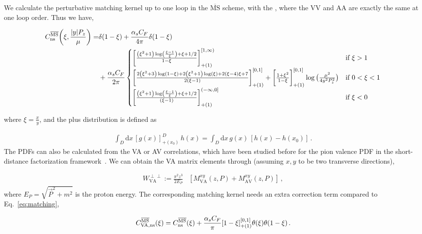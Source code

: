 \documentclass[floatfix,twocolumn,prl,showpacs,preprintnumbers,amsmath,nofootinbib,amssymb,noeprint,superscriptaddress]{revtex4-1}
\newcommand{\dd}{\mathrm{d}}
\begin{document}
We calculate the perturbative matching kernel up to one loop in the $\overline{\text{MS}}$ scheme, with the , where the VV and AA are exactly the same at one loop order. Thus we have,
\begin{widetext}
\begin{equation}\label{eq:matching}
\begin{aligned}
C_{\rm ns}^{\overline{\text{MS}}}\bigg(\xi,\frac{|y|P_z}{\mu}\bigg)=&\delta(1-\xi)+\frac{\alpha_s C_F}{4\pi}\delta(1-\xi)\\
&+\frac{\alpha_s C_F}{2\pi}
\begin{cases}
\bigg[\frac{\left(\xi ^2+1\right) \log \left(\frac{\xi -1}{\xi }\right)+\xi +1/2 }{ 1-\xi}\bigg]_{+(1)}^{[1,\infty)} & \text{if } \xi>1 \\[6pt]
\bigg[\frac{2 \left(\xi ^2+3\right) \log (1-\xi )+2 \left(\xi ^2+1\right) \log (\xi )+2 (\xi -4) \xi +7}{2 (\xi -1)}\bigg]_{+(1)}^{[0,1]}+ \bigg[\frac{1+\xi^2}{1-\xi}\bigg]_{+(1)}^{[0,1]}\log\big(\frac{\mu^2}{4y^2P_z^2}\big) & \text{if } 0<\xi<1\\[6pt]
\bigg[\frac{ \left(\xi ^2+1\right) \log \left(\frac{\xi -1}{\xi }\right)+ \xi +1/2}{ (\xi -1)}\bigg]_{+(1)}^{(-\infty,0]}& \text{if } \xi<0
\end{cases}
\end{aligned}
\end{equation}
\end{widetext}
%
where $\xi=\frac{x}{y}$, and the plus distribution is defined as

\begin{align}
\int_D \dd x \, [g(x)]^{D}_{+(x_0)} \, h(x)
=
\int_D \dd x \, g(x)\,[h(x)-h(x_0)] \, .
\end{align}
%
The PDFs can also be calculated from the VA or AV correlations, which have been studied before for the pion valence PDF in the short-distance factorization framework~\cite{Sufian:2020vzb}. We can obtain the VA matrix elements through (assuming $x,y$ to be two transverse directions),

\begin{align}
    W^{\perp\perp}_{\mathrm{VA}}:=\frac{\pi^2z^3}{2E_P}
&\left[
M^{xy}_{\mathrm{VA}}(z,P)
+
M^{xy}_{\mathrm{AV}}(z,P)
\right]\,,
\end{align}
%
where $E_P = \sqrt{\vec{P}^2 + m^2}$ is the proton energy.
The corresponding matching kernel needs an extra correction term compared to Eq.~\eqref{eq:matching},

\begin{align}
    C_{\rm VA, ns}^{\overline{\text{MS}}}(\xi)=C_{\rm ns}^{\overline{\text{MS}}}(\xi)+\frac{\alpha_sC_F}{\pi}[1-\xi]_{+(1)}^{[0,1]}\theta(\xi)\theta(1-\xi)\,.
\end{align}
\end{document}
